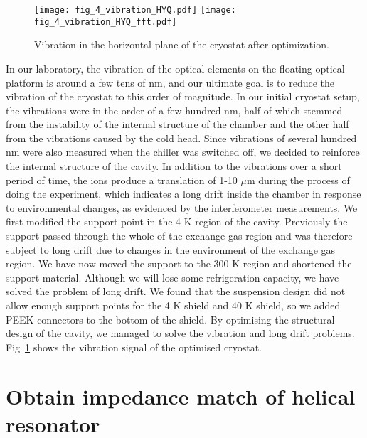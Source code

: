\begin{figure}
    \centering
    {\texttt{[image: fig\_4\_vibration\_HYQ.pdf]}}
    {\texttt{[image: fig\_4\_vibration\_HYQ\_fft.pdf]}}
    \caption{Vibration in the horizontal plane of the cryostat after optimization.}
    \label{fig:fig_4_vibration_HYQ}
\end{figure}

In our laboratory, the vibration of the optical elements on the floating optical platform is around a few tens of nm, and our ultimate goal is to reduce the vibration of the cryostat to this order of magnitude. In our initial cryostat setup, the vibrations were in the order of a few hundred nm, half of which stemmed from the instability of the internal structure of the chamber and the other half from the vibrations caused by the cold head. Since vibrations of several hundred nm were also measured when the chiller was switched off, we decided to reinforce the internal structure of the cavity. In addition to the vibrations over a short period of time, the ions produce a translation of 1-10 $\mu$m during the process of doing the experiment, which indicates a long drift inside the chamber in response to environmental changes, as evidenced by the interferometer measurements. We first modified the support point in the 4 K region of the cavity. Previously the support passed through the whole of the exchange gas region and was therefore subject to long drift due to changes in the environment of the exchange gas region. We have now moved the support to the 300 K region and shortened the support material. Although we will lose some refrigeration capacity, we have solved the problem of long drift. We found that the suspension design did not allow enough support points for the 4 K shield and 40 K shield, so we added PEEK connectors to the bottom of the shield. By optimising the structural design of the cavity, we managed to solve the vibration and long drift problems. Fig~\ref{fig:fig_4_vibration_HYQ} shows the vibration signal of the optimised cryostat.



\section {Obtain impedance match of helical resonator}

